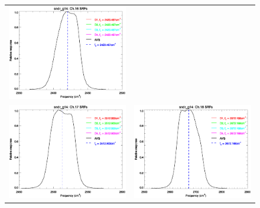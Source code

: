 \begin{figure}[htp]
\begin{tabular}{c c}
    \includegraphics[scale=0.5]{graphics/nominal/sndr_g14.ch16.srf.eps} \\
    \includegraphics[scale=0.5]{graphics/nominal/sndr_g14.ch17.srf.eps} &
    \includegraphics[scale=0.5]{graphics/nominal/sndr_g14.ch18.srf.eps}

\end{tabular}
\end{figure}
